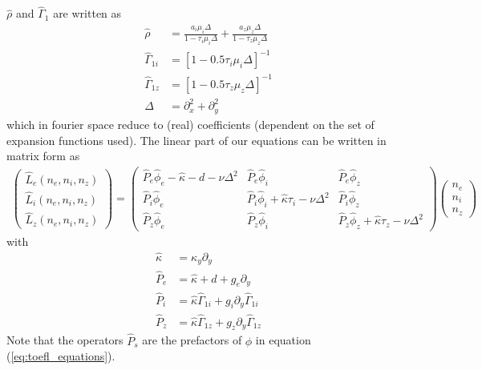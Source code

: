 \documentclass[a4paper,12pt]{scrartcl}
\begin{document}
$\hat\rho$ and $\hat\Gamma_1$ are written as 
\begin{align}
    \hat\rho &= \frac{a_i\mu_i \Delta}{1-\tau_i\mu_i\Delta} + \frac{a_z\mu_z\Delta}{1-\tau_z\mu_z\Delta}\\
    \hat\Gamma_{1i} &= [1-0.5\tau_i\mu_i\Delta]^{-1}\\
    \hat\Gamma_{1z} &= [1-0.5\tau_z\mu_z\Delta]^{-1}\\
    \Delta          &= \partial_x^2 + \partial_y^2
\end{align}
which in fourier space reduce to (real) coefficients (dependent on the set of expansion functions used).
The linear part of our equations can be written in matrix form as
\begin{align}
    \begin{pmatrix}
        \hat L_e ( n_e, n_i, n_z) \\
        \hat L_i ( n_e, n_i, n_z) \\
        \hat L_z ( n_e, n_i, n_z)
    \end{pmatrix} = 
    \begin{pmatrix}
        \hat P_e\hat \phi_e - \hat\kappa -d -\nu\Delta^2 & \hat P_e\hat \phi_i &\hat P_e \hat \phi_z\\
        \hat P_i\hat \phi_e & \hat P_i \hat \phi_i + \hat\kappa \tau_i - \nu\Delta^2 & \hat P_i \hat \phi_z \\
        \hat P_z\hat \phi_e & \hat P_z \hat \phi_i & \hat P_z \hat \phi_z + \hat\kappa \tau_z - \nu\Delta^2
    \end{pmatrix}
    \begin{pmatrix}
        n_e \\n_i\\n_z
    \end{pmatrix}
    \label{eq:linear_part}
\end{align}
with 
\begin{align}
    \hat \kappa &= \kappa_y \partial_y \\
    \hat P_e &= \hat\kappa + d +g_e\partial_y \\
    \hat P_i &= \hat\kappa \hat\Gamma_{1i}  + g_i \partial_y \hat\Gamma_{1i}\\
    \hat P_z &= \hat\kappa \hat\Gamma_{1z} + g_z \partial_y\hat\Gamma_{1z}
\end{align}
Note that the operators $\hat P_s$ are the prefactors of $\phi$ in equation (\ref{eq:toefl_equations}).
\end{document}
